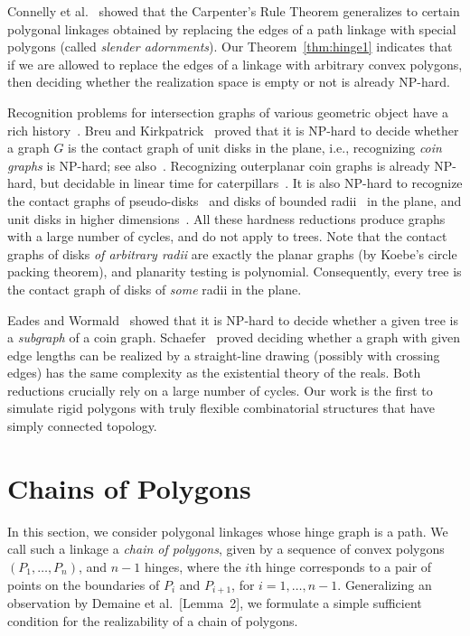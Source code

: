 \documentclass[runningheads]{article}
\begin{document}
Connelly et al.~\cite{CDD+10} showed that the Carpenter's Rule Theorem generalizes to certain polygonal linkages obtained by replacing the edges of a path linkage with special polygons (called \emph{slender adornments}). Our Theorem~\ref{thm:hinge1} indicates that if we are allowed to replace the edges of a linkage with arbitrary convex polygons, then deciding whether the realization space is empty or not is already NP-hard.

Recognition problems for intersection graphs of various geometric object have a rich history~\cite{HK01}. Breu and Kirkpatrick~\cite{BK98} proved that it is NP-hard to decide whether a graph $G$ is the contact graph of unit disks in the plane, i.e., recognizing \emph{coin graphs} is NP-hard; see also~\cite{BET+99}. Recognizing outerplanar coin graphs is already NP-hard, but decidable in linear time for caterpillars~\cite{KNR15}. It is also NP-hard to recognize the contact graphs of pseudo-disks~\cite{HK01} and disks of bounded radii~\cite{BK95} in the plane, and unit disks in higher dimensions~\cite{Hli97,HK01}. All these hardness reductions produce graphs with a large number of cycles, and do not apply to trees. Note that the contact graphs of disks \emph{of arbitrary radii} are exactly the planar graphs (by Koebe's circle packing theorem), and planarity testing is polynomial. Consequently, every tree is the contact graph of disks of \emph{some} radii in the plane.

Eades and Wormald~\cite{EW90} showed that it is NP-hard to decide whether a given tree is a \emph{subgraph} of a coin graph. Schaefer~\cite{Sch13} proved deciding whether a graph with given edge lengths can be realized by a straight-line drawing (possibly with crossing edges) has the same complexity as the existential theory of the reals. Both reductions crucially rely on a large number of cycles. Our work is the first to simulate rigid polygons with truly flexible combinatorial structures that have simply connected topology.

\section{Chains of Polygons\label{sec:path}}

In this section, we consider polygonal linkages whose hinge graph is a path. We call such a linkage a \emph{chain of polygons}, given by a sequence of convex polygons $(P_1,\ldots, P_n)$, and $n-1$ hinges, where the $i$th hinge corresponds to a pair of points on the boundaries of $P_i$ and $P_{i+1}$, for $i=1,\ldots, n-1$. 
Generalizing an observation by Demaine et al.~\cite{DEEH02}[Lemma~2], we formulate a simple sufficient condition for the realizability of a chain of polygons.
\end{document}
